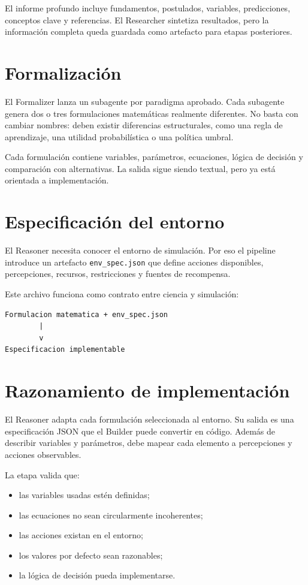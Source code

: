 El informe profundo incluye fundamentos, postulados, variables, predicciones,
conceptos clave y referencias. El Researcher sintetiza resultados, pero la
información completa queda guardada como artefacto para etapas posteriores.

\section{Formalización}

El Formalizer lanza un subagente por paradigma aprobado. Cada subagente genera
dos o tres formulaciones matemáticas realmente diferentes. No basta con cambiar
nombres: deben existir diferencias estructurales, como una regla de aprendizaje,
una utilidad probabilística o una política umbral.

Cada formulación contiene variables, parámetros, ecuaciones, lógica de decisión
y comparación con alternativas. La salida sigue siendo textual, pero ya está
orientada a implementación.

\section{Especificación del entorno}

El Reasoner necesita conocer el entorno de simulación. Por eso el pipeline
introduce un artefacto \texttt{env\_spec.json} que define acciones disponibles,
percepciones, recursos, restricciones y fuentes de recompensa.

Este archivo funciona como contrato entre ciencia y simulación:

\begin{verbatim}
Formulacion matematica + env_spec.json
        |
        v
Especificacion implementable
\end{verbatim}

\section{Razonamiento de implementación}

El Reasoner adapta cada formulación seleccionada al entorno. Su salida es una
especificación JSON que el Builder puede convertir en código. Además de describir
variables y parámetros, debe mapear cada elemento a percepciones y acciones
observables.

La etapa valida que:

\begin{itemize}
\item las variables usadas estén definidas;
\item las ecuaciones no sean circularmente incoherentes;
\item las acciones existan en el entorno;
\item los valores por defecto sean razonables;
\item la lógica de decisión pueda implementarse.
\end{itemize}

